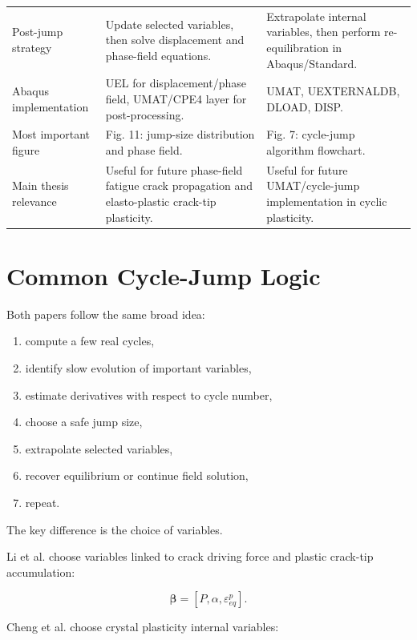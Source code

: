 \documentclass[11pt,a4paper]{article}
\begin{document}
\begin{longtable}{p{}p{}p{}}
Post-jump strategy &
Update selected variables, then solve displacement and phase-field equations. &
Extrapolate internal variables, then perform re-equilibration in Abaqus/Standard. \\

Abaqus implementation &
UEL for displacement/phase field, UMAT/CPE4 layer for post-processing. &
UMAT, UEXTERNALDB, DLOAD, DISP. \\

Most important figure &
Fig. 11: jump-size distribution and phase field. &
Fig. 7: cycle-jump algorithm flowchart. \\

Main thesis relevance &
Useful for future phase-field fatigue crack propagation and elasto-plastic crack-tip plasticity. &
Useful for future UMAT/cycle-jump implementation in cyclic plasticity. \\

\bottomrule
\end{longtable}

\section{Common Cycle-Jump Logic}

Both papers follow the same broad idea:

\begin{enumerate}
    \item compute a few real cycles,
    \item identify slow evolution of important variables,
    \item estimate derivatives with respect to cycle number,
    \item choose a safe jump size,
    \item extrapolate selected variables,
    \item recover equilibrium or continue field solution,
    \item repeat.
\end{enumerate}

The key difference is the choice of variables.

Li et al. choose variables linked to crack driving force and plastic crack-tip accumulation:

\[
\bm{\beta} = [P,\alpha,\varepsilon_{eq}^p].
\]

Cheng et al. choose crystal plasticity internal variables:
\end{document}
